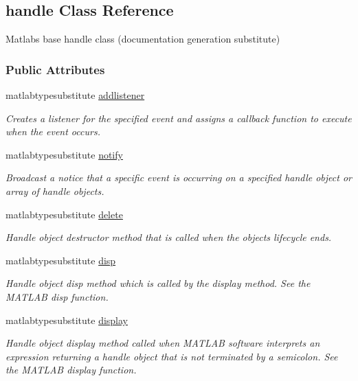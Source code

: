 \hypertarget{classhandle}{}\subsection{handle Class Reference}
\label{classhandle}


Matlab\textquotesingle{}s base handle class (documentation generation substitute)  


\subsubsection*{Public Attributes}
\begin{DoxyCompactItemize}
\item 
matlabtypesubstitute \hyperlink{classhandle_aa72d46799b8792edbf8acb7349680c15}{addlistener}
\begin{DoxyCompactList}\small\item\em Creates a listener for the specified event and assigns a callback function to execute when the event occurs. \end{DoxyCompactList}\item 
matlabtypesubstitute \hyperlink{classhandle_a8cfc3dab9d3ecc55b0b3449c2c7afd6f}{notify}
\begin{DoxyCompactList}\small\item\em Broadcast a notice that a specific event is occurring on a specified handle object or array of handle objects. \end{DoxyCompactList}\item 
matlabtypesubstitute \hyperlink{classhandle_a1d55d41c7af285b8fe7ab17ed5e176f6}{delete}
\begin{DoxyCompactList}\small\item\em Handle object destructor method that is called when the object\textquotesingle{}s lifecycle ends. \end{DoxyCompactList}\item 
matlabtypesubstitute \hyperlink{classhandle_adedb524cfbdf6a5d946cc57ef6745099}{disp}
\begin{DoxyCompactList}\small\item\em Handle object disp method which is called by the display method. See the M\+A\+T\+L\+AB disp function. \end{DoxyCompactList}\item 
matlabtypesubstitute \hyperlink{classhandle_a2e26be32e99b2b98db18bb538638b814}{display}
\begin{DoxyCompactList}\small\item\em Handle object display method called when M\+A\+T\+L\+AB software interprets an expression returning a handle object that is not terminated by a semicolon. See the M\+A\+T\+L\+AB display function. \end{DoxyCompactList}\item 

\end{DoxyCompactItemize}
